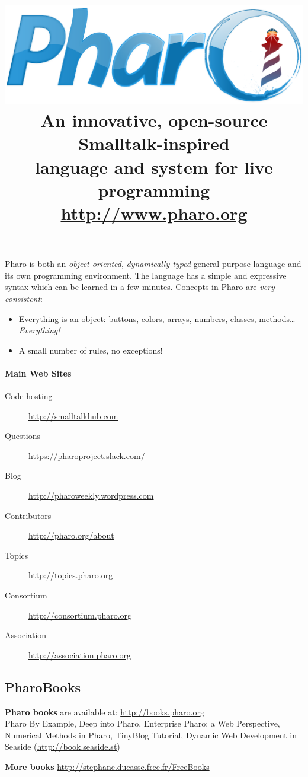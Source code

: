 \documentclass[notumble]{leaflet}
\title{\vspace{-1.0cm}\normalfont
\includegraphics[width=0.8\linewidth]{logo.pdf}
\\[1.2\baselineskip]%
\vspace{-0.8cm}
\fontseries{cl}\selectfont\LARGE
An innovative, open-source Smalltalk-inspired \\ language and system for live programming\\
\url{http://www.pharo.org}}
\date{}
\begin{document}
\maketitle
\thispagestyle{empty}
\vspace{-1.7cm}
Pharo is both an \emph{object-oriented}, \emph{dynamically-typed}
general-purpose language and its own programming environment. The
language has a simple and expressive syntax which can be learned
in a few minutes. Concepts in Pharo are \emph{very consistent}:
\begin{itemize}
  \item Everything is an object: buttons, colors, arrays, numbers, classes, methods\ldots \emph{Everything!}
  \item A small number of rules, no exceptions!
\end{itemize}

\vspace{-0.3cm}
\paragraph{Main Web Sites}
\begin{description}
 \item[Code hosting] \url{http://smalltalkhub.com}
 \item[Questions]    \url{https://pharoproject.slack.com/}
 \item[Blog] \url{http://pharoweekly.wordpress.com}
 \item[Contributors] \url{http://pharo.org/about}
 \item[Topics]       \url{http://topics.pharo.org}
 \item[Consortium]   \url{http://consortium.pharo.org}
 \item[Association]  \url{http://association.pharo.org}
\end{description}

\vspace{-0.3cm}
\subsection{PharoBooks}

\textbf{Pharo books} are available at: \url{http://books.pharo.org}\\
Pharo By Example, Deep into Pharo, Enterprise Pharo: a Web Perspective,
Numerical Methods in Pharo, TinyBlog Tutorial, Dynamic Web Development in Seaside 
(\url{http://book.seaside.st})

\textbf{More books} \url{http://stephane.ducasse.free.fr/FreeBooks}
\end{document}
